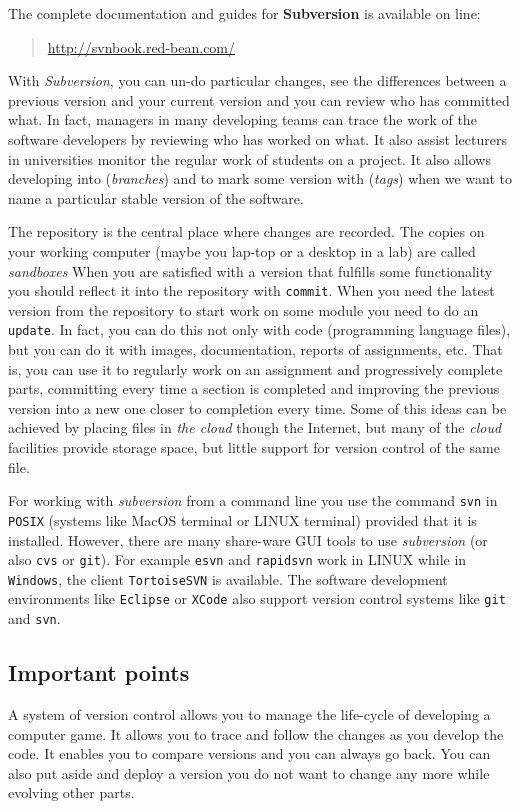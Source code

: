 \documentclass[article,12pt]{article}
\begin{document}
The complete documentation and guides for
{\bf Subversion} is available on line:
\begin{quote}
\url{http://svnbook.red-bean.com/ }
\end{quote}

With {\em Subversion},
you can un-do particular changes, see the differences between a previous version
and your current version and you can review who has committed what.
In fact, managers in many developing teams can trace the work
of the software developers by reviewing who has worked on what.
It also assist lecturers in universities monitor the regular
work of students on a project.
It also allows developing into 
 ({\em branches})
and to mark some version with
 ({\em tags})  when we want to name a particular stable version of the software.

The repository is the central place where changes are recorded.
The copies on your working computer (maybe you lap-top or a desktop
in a lab) are called 
{\em sandboxes}
When you are satisfied with a version that fulfills some functionality
you should reflect it into the repository with {\tt commit}.
When you need the latest version from the repository to
start work on some module you need to do an {\tt update}.
In fact, you can do this not only with code (programming language files),
but you can do it with images, documentation, reports of assignments, etc.
That is, you can use it to regularly work on an assignment and
progressively complete parts, committing every time a section is completed
and improving the previous version into a new one closer to completion
every time.
Some of this ideas can be achieved by placing files in {\em the cloud}
though the Internet, but many of the {\em cloud} facilities
provide storage space, but little support for version control of
the same file.

For working with {\em subversion} from a command line you use
the command {\tt svn} in {\tt POSIX} (systems like MacOS terminal
or LINUX terminal) provided that it is installed.
However, there are many share-ware GUI tools to use
{\em subversion} (or also {\tt cvs} or {\tt git}).
For example
{\tt esvn} and  {\tt rapidsvn} work in LINUX 
while
in {\tt Windows}, the client {\tt TortoiseSVN} is available.
The software development environments like
{\tt Eclipse} or {\tt XCode} also support version control systems like
{\tt git} and {\tt svn}.

\subsection*{Important points}
A system of version control allows you to manage the life-cycle of developing
a computer game. It allows you to trace and follow the changes as you
develop the code. It enables you to compare versions and
you can always go back.
You can also put aside and deploy a version you do not want to change any more
while evolving other parts.
\end{document}
